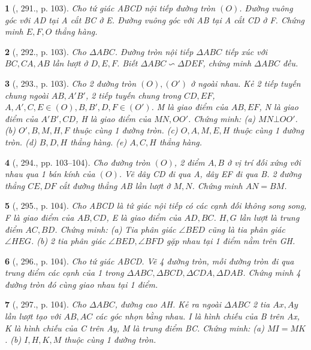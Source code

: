 \documentclass{article}
\newtheorem{baitoan}{}
\begin{document}
\begin{baitoan}[\cite{Binh_Toan_9_tap_2}, 291., p. 103]
	Cho tứ giác ABCD nội tiếp đường tròn $(O)$. Đường vuông góc với AD tại A cắt BC ở E. Đường vuông góc với AB tại A cắt CD ở F. Chứng minh $E,F,O$ thẳng hàng.
\end{baitoan}

\begin{baitoan}[\cite{Binh_Toan_9_tap_2}, 292., p. 103]
	Cho $\Delta ABC$. Đường tròn nội tiếp $\Delta ABC$ tiếp xúc với $BC,CA,AB$ lần lượt ở $D,E,F$. Biết $\Delta ABC\backsim\Delta DEF$, chứng minh $\Delta ABC$ đều.
\end{baitoan}

\begin{baitoan}[\cite{Binh_Toan_9_tap_2}, 293., p. 103]
	Cho 2 đường tròn $(O),(O')$ ở ngoài nhau. Kẻ 2 tiếp tuyến chung ngoài $AB,A'B'$, 2 tiếp tuyến chung trong $CD,EF$, $A,A',C,E\in(O),B,B',D,F\in(O')$. M là giao điểm của $AB,EF$, N là giao điểm của $A'B',CD$, H là giao điểm của $MN,OO'$. Chứng minh: (a) $MN\bot OO'$. (b) $O',B,M,H,F$ thuộc cùng 1 đường tròn. (c) $O,A,M,E,H$ thuộc cùng 1 đường tròn. (d) $B,D,H$ thẳng hàng. (e) $A,C,H$ thẳng hàng.
\end{baitoan}

\begin{baitoan}[\cite{Binh_Toan_9_tap_2}, 294., pp. 103--104]
	Cho đường tròn $(O)$, 2 điểm $A,B$ ở vị trí đối xứng với nhau qua 1 bán kính của $(O)$. Vẽ dây CD đi qua A, dây EF đi qua B. 2 đường thẳng $CE,DF$ cắt đường thẳng AB lần lượt ở $M,N$. Chứng minh $AN = BM$.
\end{baitoan}

\begin{baitoan}[\cite{Binh_Toan_9_tap_2}, 295., p. 104]
	Cho ABCD là tứ giác nội tiếp có các cạnh đối không song song, F là giao điểm của $AB,CD$, E là giao điểm của $AD,BC$. $H,G$ lần lượt là trung điểm $AC,BD$. Chứng minh: (a) Tia phân giác $\angle{BED}$ cũng là tia phân giác $\angle{HEG}$. (b) 2 tia phân giác $\angle{BED},\angle{BFD}$ gặp nhau tại 1 điểm nằm trên GH.
\end{baitoan}

\begin{baitoan}[\cite{Binh_Toan_9_tap_2}, 296., p. 104]
	Cho tứ giác ABCD. Vẽ 4 đường tròn, mỗi đường tròn đi qua trung điểm các cạnh của 1 trong $\Delta ABC,\Delta BCD,\Delta CDA,\Delta DAB$. Chứng minh 4 đường tròn đó cùng giao nhau tại 1 điểm.
\end{baitoan}

\begin{baitoan}[\cite{Binh_Toan_9_tap_2}, 297., p. 104]
	Cho $\Delta ABC$, đường cao AH. Kẻ ra ngoài $\Delta ABC$ 2 tia $Ax,Ay$ lần lượt tạo với $AB,AC$ các góc nhọn bằng nhau. I là hình chiếu của B trên Ax, K là hình chiếu của C trên Ay, M là trung điểm BC. Chứng minh: (a) $MI = MK$. (b) $I,H,K,M$ thuộc cùng 1 đường tròn.
\end{baitoan}
\end{document}
